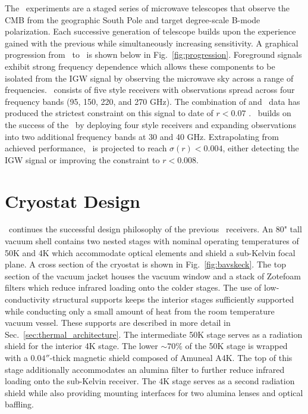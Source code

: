 \documentclass[]{spie}  %
\begin{document}
The \bk\ experiments are a staged series of microwave telescopes that observe
the CMB from the geographic South Pole and target degree-scale B-mode
polarization. Each successive generation of telescope builds upon the
experience gained with the previous while simultaneously increasing
sensitivity. A graphical progression from \ to \biceparray\ is shown
below in Fig.~\ref{fig:progression}. Foreground signals exhibit strong
frequency dependence which allows these components to be isolated from the IGW
signal by observing the microwave sky across a range of frequencies.
\keckarray\ consists of five  style receivers\cite{ogburn2010,sheehy2010} with observations spread
across four frequency bands (95, 150, 220, and 270 GHz). The combination of
  and \keckarray\ data has produced the strictest constraint on
this signal to date of $r<0.07$ \cite{bk_vi}. \biceparray\ builds on the success
of the \keckarray\ by deploying four  style receivers\cite{ahmed2014} and expanding
observations into two additional frequency bands at 30 and 40 GHz.
Extrapolating from achieved performance, \biceparray\ is projected to reach
$\sigma(r)<0.004$, either detecting the IGW signal or improving the constraint
to $r<0.008$. 



	
\section{Cryostat Design}

\biceparray\ continues the successful design philosophy of
the previous \bk\ receivers. An 80" tall vacuum shell contains two nested
stages with nominal operating temperatures of 50K and 4K which accommodate
optical elements and shield a sub-Kelvin focal plane. A cross section of
the cryostat is shown in Fig.~\ref{fig:bavskeck}. The top section of the
vacuum jacket houses the vacuum window and a stack of Zotefoam filters which reduce infrared loading
onto the colder stages. The use of low-conductivity structural supports keeps
the interior stages sufficiently supported while conducting only a small
amount of heat from the room temperature vacuum vessel. These supports are
described in more detail in Sec.~\ref{sec:thermal_architecture}. The
intermediate 50K stage serves as a radiation shield for the interior 4K stage.
The lower $\sim70\%$ of the 50K stage is wrapped with a $0.04''$-thick magnetic
shield composed of Amuneal A4K. The top of this stage additionally
accommodates an alumina filter to further reduce infrared loading onto the
sub-Kelvin receiver. The 4K stage serves as a second radiation shield while
also providing mounting interfaces for two alumina lenses and optical
baffling.
\end{document}
